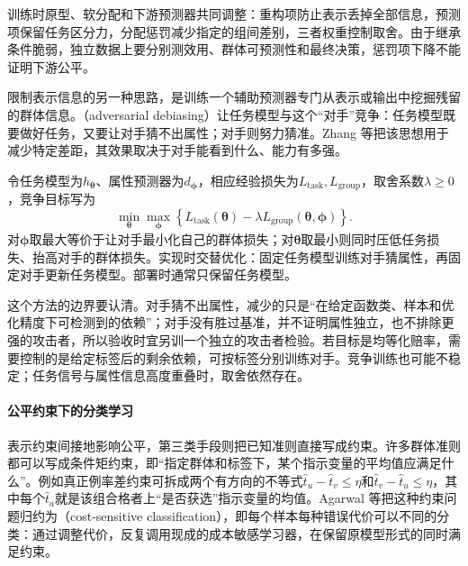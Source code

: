 训练时原型、软分配和下游预测器共同调整：重构项防止表示丢掉全部信息，预测项保留任务区分力，分配惩罚减少指定的组间差别，三者权重控制取舍。由于继承条件脆弱，独立数据上要分别测效用、群体可预测性和最终决策，惩罚项下降不能证明下游公平。

限制表示信息的另一种思路，是训练一个辅助预测器专门从表示或输出中挖掘残留的群体信息。（adversarial debiasing）让任务模型与这个“对手”竞争：任务模型既要做好任务，又要让对手猜不出属性；对手则努力猜准。Zhang 等把该思想用于减少特定差距，其效果取决于对手能看到什么、能力有多强。

令任务模型为$h_{\bm{\theta}}$、属性预测器为$d_{\bm{\phi}}$，相应经验损失为$L_{\mathrm{task}},L_{\mathrm{group}}$，取舍系数$\lambda\geq0$，竞争目标写为
\[
 \min_{\bm{\theta}}\max_{\bm{\phi}}
 \left\{L_{\mathrm{task}}(\bm{\theta})
       -\lambda L_{\mathrm{group}}(\bm{\theta},\bm{\phi})\right\}.
\]
对$\bm\phi$取最大等价于让对手最小化自己的群体损失；对$\bm\theta$取最小则同时压低任务损失、抬高对手的群体损失。实现时交替优化：固定任务模型训练对手猜属性，再固定对手更新任务模型。部署时通常只保留任务模型。

这个方法的边界要认清。对手猜不出属性，减少的只是“在给定函数类、样本和优化精度下可检测到的依赖”；对手没有胜过基准，并不证明属性独立，也不排除更强的攻击者，所以验收时宜另训一个独立的攻击者检验。若目标是均等化赔率，需要控制的是给定标签后的剩余依赖，可按标签分别训练对手。竞争训练也可能不稳定；任务信号与属性信息高度重叠时，取舍依然存在。

\paragraph{公平约束下的分类学习}

表示约束间接地影响公平，第三类手段则把已知准则直接写成约束。许多群体准则都可以写成条件矩约束，即“指定群体和标签下，某个指示变量的平均值应满足什么”。例如真正例率差约束可拆成两个有方向的不等式$\hat t_u-\hat t_v\leq\eta$和$\hat t_v-\hat t_u\leq\eta$，其中每个$\hat t_a$就是该组合格者上“是否获选”指示变量的均值。Agarwal 等把这种约束问题归约为（cost-sensitive classification），即每个样本每种错误代价可以不同的分类：通过调整代价，反复调用现成的成本敏感学习器，在保留原模型形式的同时满足约束。

